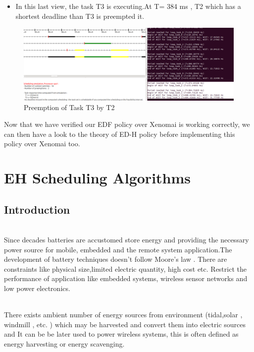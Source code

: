 \documentclass[12pt,hidelinks]{article}
\begin{document}
{\begin{itemize}
            \newpage \item In this last view, the task T3 is executing.At T= 384 ms , T2 which has a shortest deadline than T3 is preempted it.
         \end{itemize}           
            \begin{figure}[h]
                \hspace*{-2cm}  
                \centering
                \includegraphics[scale=0.4]{T2overT3.png}
                \caption{Preemption of Task T3 by T2}
        	\end{figure} \newline
            
    Now that we have verified our EDF policy over Xenomai is working correctly, we can then have a look to the theory of ED-H policy before implementing this policy over Xenomai too.

\newpage	

\section{EH Scheduling Algorithms}
\vspace{4cm}

\subsection{Introduction}
\\Since decades batteries are accustomed store energy and providing the necessary power source for mobile, embedded and the remote system application.The development of battery techniques doesn't follow Moore's law . There are constraints like physical size,limited electric quantity, high cost etc. Restrict the performance of application like embedded systems, wireless sensor networks and low power electronics.\newline

\\There exists ambient number of energy sources from environment (tidal,solar , windmill , etc. ) which may be harvested and convert them into electric sources and It can be be later used to power wireless systems, this is often defined as energy harvesting or energy scavenging\cite{mipi-csi}.\newline

}
\end{document}
